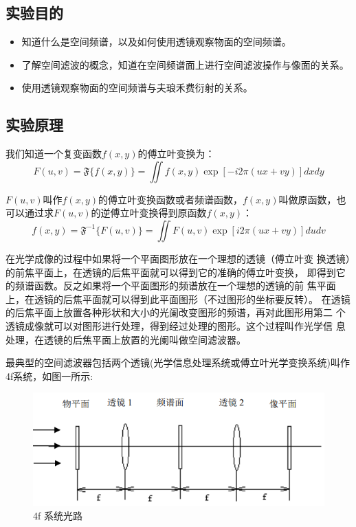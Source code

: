 \documentclass{ctexart}
\begin{document}
	
\subsection*{实验目的}
\begin{itemize}
    \item 知道什么是空间频谱，以及如何使用透镜观察物面的空间频谱。
    \item 了解空间滤波的概念，知道在空间频谱面上进行空间滤波操作与像面的关系。
    \item 使用透镜观察物面的空间频谱与夫琅禾费衍射的关系。
\end{itemize}
\subsection*{实验原理}
我们知道一个复变函数$f(x,y)$的傅立叶变换为：
$$
F(u, v) = \mathfrak{F} \{f(x, y)\} = \iint f(x, y) \exp[-i2\pi(ux+vy)]dxdy
$$

$F(u,v)$叫作$f(x,y)$的傅立叶变换函数或者频谱函数，$f(x, y)$叫做原函数，也可以通过求$F(u, v)$的逆傅立叶变换得到原函数$f(x, y)$：
$$
f(x, y) = \mathfrak{F}^{-1}\{F(u, v)\} = \iint F(u, v)\exp{[i2\pi(ux+vy)]}dudv
$$

在光学成像的过程中如果将一个平面图形放在一个理想的透镜（傅立叶变
换透镜）的前焦平面上，在透镜的后焦平面就可以得到它的准确的傅立叶变换，
即得到它的频谱函数。反之如果将一个平面图形的频谱放在一个理想的透镜的前
焦平面上，在透镜的后焦平面就可以得到此平面图形（不过图形的坐标要反转）。
在透镜的后焦平面上放置各种形状和大小的光阑改变图形的频谱，再对此图形用第二
个透镜成像就可以对图形进行处理，得到经过处理的图形。这个过程叫作光学信
息处理，在透镜的后焦平面上放置的光阑叫做空间滤波器。

最典型的空间滤波器包括两个透镜(光学信息处理系统或傅立叶光学变换系统)叫作4f系统，如图一所示:
\begin{figure}[htbp]
	\centering
	\includegraphics[scale=0.3]{1.png}
	\caption{4f 系统光路}
\end{figure}
\end{document}
